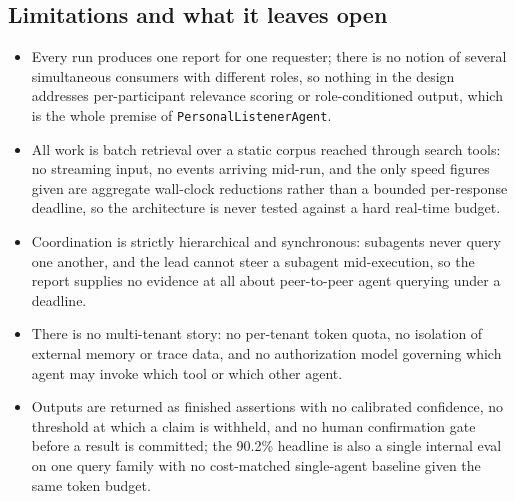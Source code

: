 \subsection{Limitations and what it leaves open}
\begin{itemize}[leftmargin=1.2em, itemsep=1pt, topsep=2pt]
  \item Every run produces one report for one requester; there is no notion of several simultaneous consumers with different roles, so nothing in the design addresses per-participant relevance scoring or role-conditioned output, which is the whole premise of \texttt{PersonalListenerAgent}.
  \item All work is batch retrieval over a static corpus reached through search tools: no streaming input, no events arriving mid-run, and the only speed figures given are aggregate wall-clock reductions rather than a bounded per-response deadline, so the architecture is never tested against a hard real-time budget.
  \item Coordination is strictly hierarchical and synchronous: subagents never query one another, and the lead cannot steer a subagent mid-execution, so the report supplies no evidence at all about peer-to-peer agent querying under a deadline.
  \item There is no multi-tenant story: no per-tenant token quota, no isolation of external memory or trace data, and no authorization model governing which agent may invoke which tool or which other agent.
  \item Outputs are returned as finished assertions with no calibrated confidence, no threshold at which a claim is withheld, and no human confirmation gate before a result is committed; the 90.2\% headline is also a single internal eval on one query family with no cost-matched single-agent baseline given the same token budget.
\end{itemize}
